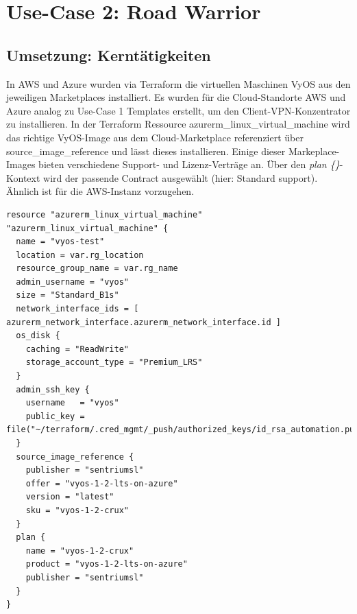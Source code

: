 \section{Use-Case 2: Road Warrior} \label{Use-Case 2: Road Warrior}

\subsection{Umsetzung: Kerntätigkeiten}


In AWS und Azure wurden via Terraform die virtuellen Maschinen VyOS aus den jeweiligen Marketplaces installiert.
Es wurden für die Cloud-Standorte AWS und Azure analog zu Use-Case 1 Templates erstellt, um den Client-VPN-Konzentrator zu installieren. In der Terraform Ressource azurerm\_linux\_virtual\_machine wird das richtige VyOS-Image aus dem Cloud-Marketplace referenziert über source\_image\_reference und lässt dieses installieren. Einige dieser Markeplace-Images bieten verschiedene Support- und Lizenz-Verträge an. Über den \textit{plan \{\}}-Kontext wird der passende Contract ausgewählt (hier: \glqq Standard support\grqq{}). Ähnlich ist für die AWS-Instanz vorzugehen.

\begin{lstlisting}[label=tf-azure-vyos-machine-image,caption=Mit der Terraform-Ressource wird das passende VyOS-Image gesucht und installiert.]
resource "azurerm_linux_virtual_machine"  "azurerm_linux_virtual_machine" {
  name = "vyos-test"
  location = var.rg_location
  resource_group_name = var.rg_name
  admin_username = "vyos"
  size = "Standard_B1s"
  network_interface_ids = [ azurerm_network_interface.azurerm_network_interface.id ]
  os_disk {
    caching = "ReadWrite"
    storage_account_type = "Premium_LRS"
  }
  admin_ssh_key {
    username   = "vyos"
    public_key = file("~/terraform/.cred_mgmt/_push/authorized_keys/id_rsa_automation.pub")
  }
  source_image_reference {
    publisher = "sentriumsl"
    offer = "vyos-1-2-lts-on-azure"
    version = "latest"
    sku = "vyos-1-2-crux"
  }
  plan {
    name = "vyos-1-2-crux"
    product = "vyos-1-2-lts-on-azure"
    publisher = "sentriumsl"
  }
}
\end{lstlisting}

